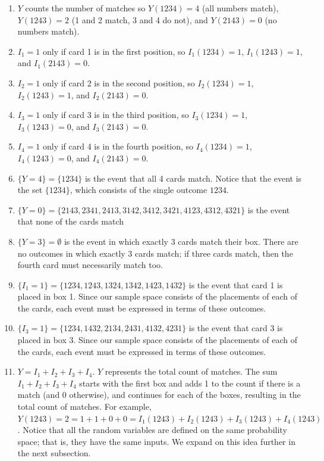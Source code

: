 \documentclass[
]{book}
\providecommand{\tightlist}{%
  \setlength{\itemsep}{0pt}\setlength{\parskip}{0pt}}
\theoremstyle{definition}
\theoremstyle{definition}
\theoremstyle{definition}
\theoremstyle{remark}
\begin{document}
\begin{enumerate}
\def\labelenumi{\arabic{enumi}.}
\tightlist
\item
  \(Y\) counts the number of matches so \(Y(1234)=4\) (all numbers match), \(Y(1243)=2\) (1 and 2 match, 3 and 4 do not), and \(Y(2143)=0\) (no numbers match).
\item
  \(I_1=1\) only if card 1 is in the first position, so \(I_1(1234)=1\), \(I_1(1243)=1\), and \(I_1(2143)=0\).
\item
  \(I_2=1\) only if card 2 is in the second position, so \(I_2(1234)=1\), \(I_2(1243)=1\), and \(I_2(2143)=0\).
\item
  \(I_3=1\) only if card 3 is in the third position, so \(I_3(1234)=1\), \(I_3(1243)=0\), and \(I_3(2143)=0\).
\item
  \(I_4=1\) only if card 4 is in the fourth position, so \(I_4(1234)=1\), \(I_4(1243)=0\), and \(I_4(2143)=0\).
\item
  \(\{Y=4\}=\{1234\}\) is the event that all 4 cards match. Notice that the event is the set \(\{1234\}\), which consists of the single outcome \(1234\).
\item
  \(\{Y=0\}=\{2143, 2341, 2413, 3142, 3412, 3421, 4123, 4312, 4321\}\) is the event that none of the cards match
\item
  \(\{Y=3\}=\emptyset\) is the event in which exactly 3 cards match their box. There are no outcomes in which exactly 3 cards match; if three cards match, then the fourth card must necessarily match too.
\item
  \(\{I_1=1\}=\{1234, 1243, 1324, 1342, 1423, 1432\}\) is the event that card 1 is placed in box 1. Since our sample space consists of the placements of each of the cards, each event must be expressed in terms of these outcomes.
\item
  \(\{I_3=1\}=\{1234, 1432, 2134, 2431, 4132, 4231\}\) is the event that card 3 is placed in box 3. Since our sample space consists of the placements of each of the cards, each event must be expressed in terms of these outcomes.
\item
  \(Y=I_1+I_2+I_3+I_4\). \(Y\) represents the total count of matches. The sum \(I_1+I_2+I_3+I_4\) starts with the first box and adds 1 to the count if there is a match (and 0 otherwise), and continues for each of the boxes, resulting in the total count of matches. For example, \(Y(1243) = 2 = 1 + 1 + 0 + 0 = I_1(1243)+I_2(1243)+I_3(1243)+I_4(1243)\). Notice that all the random variables are defined on the same probability space; that is, they have the same inputs. We expand on this idea further in the next subsection.
\end{enumerate}
\end{document}

